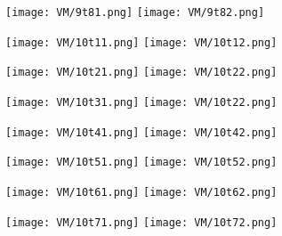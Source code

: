 \begin{figure}[h]
		\centering
		\texttt{[image: VM/9t81.png]}
		\texttt{[image: VM/9t82.png]}
\label{ris:image}
\end{figure}



\begin{figure}[h]
		\centering
		\texttt{[image: VM/10t11.png]}
		\texttt{[image: VM/10t12.png]}
\label{ris:image}
\end{figure}



\begin{figure}[h]
		\centering
		\texttt{[image: VM/10t21.png]}
		\texttt{[image: VM/10t22.png]}
\label{ris:image}
\end{figure}



\begin{figure}[h]
		\centering
		\texttt{[image: VM/10t31.png]}
		\texttt{[image: VM/10t22.png]}
\label{ris:image}
\end{figure}




\begin{figure}[h]
		\centering
		\texttt{[image: VM/10t41.png]}
		\texttt{[image: VM/10t42.png]}
\label{ris:image}
\end{figure}



\begin{figure}[h]
		\centering
		\texttt{[image: VM/10t51.png]}
		\texttt{[image: VM/10t52.png]}
\label{ris:image}
\end{figure}



\begin{figure}[h]
		\centering
		\texttt{[image: VM/10t61.png]}
		\texttt{[image: VM/10t62.png]}
\label{ris:image}
\end{figure}



\begin{figure}[h]
		\centering
		\texttt{[image: VM/10t71.png]}
		\texttt{[image: VM/10t72.png]}
\label{ris:image}
\end{figure}


